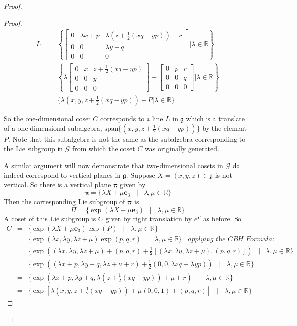 \documentclass[honours]{UNSWthesis}
\newcommand{\R}{\mathbb{R}}
\newcommand{\G}{\mathcal{G}}
\newcommand{\g}{\mathfrak{g}}
\newcommand{\1}{\mathbf{e}_{1}}
\newcommand{\2}{\mathbf{e}_{3}}
\newcommand{\3}{\mathbf{e}_{3}}
\begin{document}
\begin{proof}
\begin{proof}
\begin{eqnarray*}
L &=& \left\lbrace
\begin{bmatrix}
0 & \lambda x + p & \lambda (z+\frac{1}{2}(xq-yp))+r \\
0 & 0 & \lambda y +q \\
0 & 0 & 0
\end{bmatrix}
\bigg| \lambda \in \R \right\rbrace \\
&=& \left\lbrace \lambda
\begin{bmatrix}
0 &  x & z+\frac{1}{2}(xq-yp) \\
0 & 0 & y \\
0 & 0 & 0
\end{bmatrix} +
\begin{bmatrix}
0 & p & r \\
0 & 0 & q \\
0 & 0 & 0
\end{bmatrix}
\bigg| \lambda \in \R \right\rbrace \\
&=& \{ \lambda (x,y,z+\frac{1}{2}(xq-yp))+P | \lambda \in \R \}
\end{eqnarray*}

So the one-dimensional coset $C$ corresponds to a line $L$ in $\g$ which is a translate of a one-dimensional subalgebra, $\text{span}\{(x,y,z+\frac{1}{2}(xq-yp))\}$ by the element $P$. Note that this subalgebra is not the same as the subalgebra corresponding to the Lie subgroup in $\G$ from which the coset $C$ was originally generated. 

A similar argument will now demonstrate that two-dimensional cosets in $\G$ do indeed correspond to vertical planes in $\g$.
Suppose $X=(x,y,z) \in \g$ is not vertical. So there is a vertical plane $\mathbf{\pi}$ given by 
\[
\mathbf{\pi} = \{\lambda X + \mu \3 \;\;\;|\;\;\; \lambda,\mu \in \R \}
\]
Then the corresponding Lie subgroup of $\mathbf{\pi}$ is 
\[
\Pi = \{\exp(\lambda X + \mu \3) \;\;\;|\;\;\; \lambda,\mu \in \R \}
\]
A coset of this Lie subgroup is $C$ given by right translation by $e^{P}$ as before. So 
\begin{eqnarray*}
C &=& \{\exp(\lambda X + \mu \3)\exp (P) \;\;\;|\;\;\; \lambda,\mu \in \R \} \\
&=& \{ \exp(\lambda x, \lambda y, \lambda z +\mu)\exp(p,q,r)\;\;\;|\;\;\; \lambda,\mu \in \R \} \;\;\;\textit{applying the CBH Formula:}\\
&=&  \{ \exp((\lambda x, \lambda y, \lambda z +\mu)+(p,q,r)+\frac{1}{2}[(\lambda x, \lambda y, \lambda z +\mu),(p,q,r)])\;\;\;|\;\;\; \lambda,\mu \in \R \} \\
&=& \{ \exp ((\lambda x+p, \lambda y+q, \lambda z +\mu +r)+ \frac{1}{2}(0,0,\lambda xq -\lambda yp))\;\;\;|\;\;\; \lambda,\mu \in \R \} \\
&=& \{ \exp (\lambda x+p, \lambda y+q, \lambda (z+\frac{1}{2}(xq-yp)) +\mu +r)\;\;\;|\;\;\; \lambda,\mu \in \R \} \\
&=& \{ \exp [\lambda( x, y, z+\frac{1}{2}(xq-yp))+\mu(0,0,1)+(p,q,r)]\;\;\;|\;\;\; \lambda,\mu \in \R \}
\end{eqnarray*}


\end{proof}
\end{proof}
\end{document}
